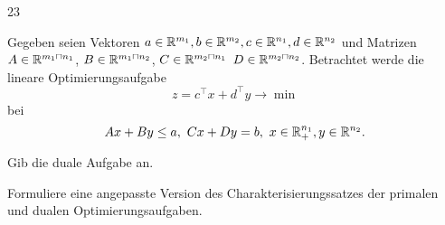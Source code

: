 23
\begin{exercise}
    Gegeben seien Vektoren $a\in\mathbb{R}^{m_1}, b\in\mathbb{R}^{m_2}, c\in\mathbb{R}^{n_1}, d\in\mathbb{R}^{n_2}$ und Matrizen $A\in\reals^{m_1\settimes n_1}$, $B\in\reals^{m_1\settimes n_2}$, $C\in\reals^{m_2\settimes n_1}$ $D\in\reals^{m_2\settimes n_2}$. Betrachtet werde die lineare Optimierungsaufgabe
    $$
    z=c^\top x + d^\top y\to\min
    $$
    bei
    $$
    Ax+By\leq a,\ Cx+Dy=b,\ x\in\reals^{n_1}_+, y\in\reals^{n_2}.
    $$
    \begin{tasks}
            \item Gib die duale Aufgabe an.
            \item Formuliere eine angepasste Version des Charakterisierungssatzes der primalen und dualen Optimierungsaufgaben.
    \end{tasks}
\end{exercise}

